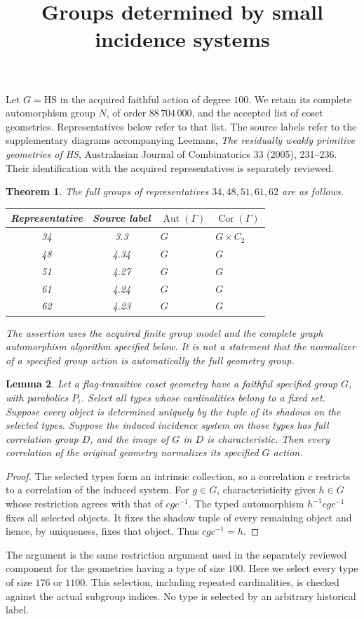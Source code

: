 \documentclass[11pt]{article}
\title{Groups determined by small incidence systems}
\author{}\date{}
\newtheorem{theorem}{Theorem}\newtheorem{lemma}[theorem]{Lemma}
\newcommand{\Aut}{\operatorname{Aut}}\newcommand{\Cor}{\operatorname{Cor}}
\begin{document}
\maketitle
Let $G=\mathrm{HS}$ in the acquired faithful action of degree $100$.
We retain its complete automorphism group $N$, of order $88\,704\,000$,
and the accepted list of coset geometries. Representatives below refer
to that list. The source labels refer to the supplementary diagrams
accompanying Leemans, \emph{The residually weakly primitive geometries
of HS}, Australasian Journal of Combinatorics 33 (2005), 231--236.
Their identification with the acquired representatives is separately reviewed.

\begin{theorem}
The full groups of representatives $34,48,51,61,62$ are as follows.
\begin{center}
\begin{tabular}{ccll}\toprule
Representative&Source label&$\Aut(\Gamma)$&$\Cor(\Gamma)$\\\midrule
34&3.3&$G$&$G\times C_2$\\
48&4.34&$G$&$G$\\
51&4.27&$G$&$G$\\
61&4.24&$G$&$G$\\
62&4.23&$G$&$G$\\\bottomrule
\end{tabular}
\end{center}
The assertion uses the acquired finite group model and the complete
graph automorphism algorithm specified below. It is not a statement
that the normalizer of a specified group action is automatically the
full geometry group.
\end{theorem}

\begin{lemma}
Let a flag-transitive coset geometry have a faithful specified group
$G$, with parabolics $P_i$. Select all types whose cardinalities belong
to a fixed set. Suppose every object is determined uniquely by the
tuple of its shadows on the selected types. Suppose the induced
incidence system on those types has full correlation group $D$, and
the image of $G$ in $D$ is characteristic. Then every correlation
of the original geometry normalizes its specified $G$ action.
\end{lemma}
\begin{proof}
The selected types form an intrinsic collection, so a correlation $c$
restricts to a correlation of the induced system. For $g\in G$,
characteristicity gives $h\in G$ whose restriction agrees with that
of $cgc^{-1}$. The typed automorphism $h^{-1}cgc^{-1}$ fixes all
selected objects. It fixes the shadow tuple of every remaining object
and hence, by uniqueness, fixes that object. Thus $cgc^{-1}=h$.
\end{proof}
The argument is the same restriction argument used in the separately
reviewed component for the geometries having a type of size $100$.
Here we select every type of size $176$ or $1100$. This selection,
including repeated cardinalities, is checked against the actual subgroup
indices. No type is selected by an arbitrary historical label.
\end{document}

